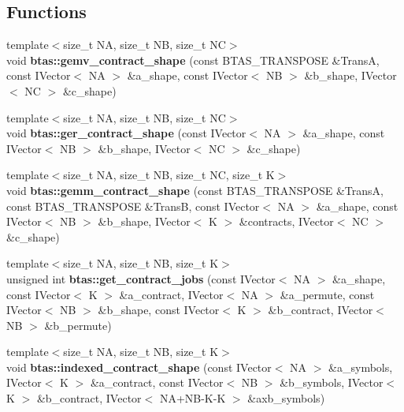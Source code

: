 \subsection*{Functions}
\begin{DoxyCompactItemize}
\item 
{\footnotesize template$<$size\-\_\-t N\-A, size\-\_\-t N\-B, size\-\_\-t N\-C$>$ }\\void {\bf btas\-::gemv\-\_\-contract\-\_\-shape} (const B\-T\-A\-S\-\_\-\-T\-R\-A\-N\-S\-P\-O\-S\-E \&Trans\-A, const I\-Vector$<$ N\-A $>$ \&a\-\_\-shape, const I\-Vector$<$ N\-B $>$ \&b\-\_\-shape, I\-Vector$<$ N\-C $>$ \&c\-\_\-shape)
\item 
{\footnotesize template$<$size\-\_\-t N\-A, size\-\_\-t N\-B, size\-\_\-t N\-C$>$ }\\void {\bf btas\-::ger\-\_\-contract\-\_\-shape} (const I\-Vector$<$ N\-A $>$ \&a\-\_\-shape, const I\-Vector$<$ N\-B $>$ \&b\-\_\-shape, I\-Vector$<$ N\-C $>$ \&c\-\_\-shape)
\item 
{\footnotesize template$<$size\-\_\-t N\-A, size\-\_\-t N\-B, size\-\_\-t N\-C, size\-\_\-t K$>$ }\\void {\bf btas\-::gemm\-\_\-contract\-\_\-shape} (const B\-T\-A\-S\-\_\-\-T\-R\-A\-N\-S\-P\-O\-S\-E \&Trans\-A, const B\-T\-A\-S\-\_\-\-T\-R\-A\-N\-S\-P\-O\-S\-E \&Trans\-B, const I\-Vector$<$ N\-A $>$ \&a\-\_\-shape, const I\-Vector$<$ N\-B $>$ \&b\-\_\-shape, I\-Vector$<$ K $>$ \&contracts, I\-Vector$<$ N\-C $>$ \&c\-\_\-shape)
\item 
{\footnotesize template$<$size\-\_\-t N\-A, size\-\_\-t N\-B, size\-\_\-t K$>$ }\\unsigned int {\bf btas\-::get\-\_\-contract\-\_\-jobs} (const I\-Vector$<$ N\-A $>$ \&a\-\_\-shape, const I\-Vector$<$ K $>$ \&a\-\_\-contract, I\-Vector$<$ N\-A $>$ \&a\-\_\-permute, const I\-Vector$<$ N\-B $>$ \&b\-\_\-shape, const I\-Vector$<$ K $>$ \&b\-\_\-contract, I\-Vector$<$ N\-B $>$ \&b\-\_\-permute)
\item 
{\footnotesize template$<$size\-\_\-t N\-A, size\-\_\-t N\-B, size\-\_\-t K$>$ }\\void {\bf btas\-::indexed\-\_\-contract\-\_\-shape} (const I\-Vector$<$ N\-A $>$ \&a\-\_\-symbols, I\-Vector$<$ K $>$ \&a\-\_\-contract, const I\-Vector$<$ N\-B $>$ \&b\-\_\-symbols, I\-Vector$<$ K $>$ \&b\-\_\-contract, I\-Vector$<$ N\-A+N\-B-\/K-\/K $>$ \&axb\-\_\-symbols)
\end{DoxyCompactItemize}
